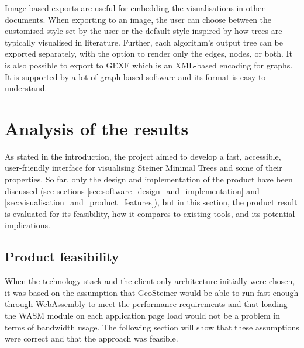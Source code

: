 \documentclass{l4proj}
\begin{document}
Image-based exports are useful for embedding the visualisations in other documents.
When exporting to an image, the user can choose between the customised style set by the user or the default style inspired by how trees are typically visualised in literature. Further, each algorithm's output tree can be exported separately, with the option to render only the edges, nodes, or both.
It is also possible to export to GEXF which is an XML-based encoding for graphs. It is supported by a lot of graph-based software and its format is easy to understand.




\chapter{Analysis of the results}
\label{sec:analysis_results}
As stated in the introduction, the project aimed to develop a fast, accessible, user-friendly interface for visualising Steiner Minimal Trees and some of their properties.
So far, only the design and implementation of the product have been discussed (see sections \ref{sec:software_design_and_implementation} and \ref{sec:visualisation_and_product_features}), but in this section, the product result is evaluated for its feasibility, how it compares to existing tools, and its potential implications.

\section{Product feasibility}
When the technology stack and the client-only architecture initially were chosen, it was based on the assumption that GeoSteiner would be able to run fast enough through WebAssembly to meet the performance requirements and that loading the WASM module on each application page load would not be a problem in terms of bandwidth usage. The following section will show that these assumptions were correct and that the approach was feasible.
\end{document}
